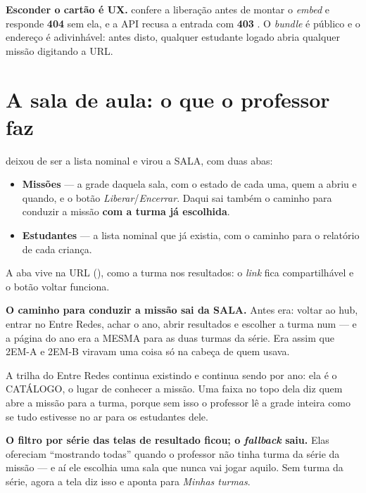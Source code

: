 \begin{regra}
\textbf{Esconder o cartão é UX.}  confere a liberação antes de
montar o \emph{embed} e responde \textbf{404} sem ela, e a API recusa a entrada com
\textbf{403} . O \emph{bundle} é público e o endereço é
adivinhável: antes disto, qualquer estudante logado abria qualquer missão
digitando a URL.
\end{regra}

\section{A sala de aula: o que o professor faz}
\label{sec:sala-do-professor}

 deixou de ser a lista nominal e virou a SALA, com
duas abas:

\begin{itemize}
  \item \textbf{Missões} --- a grade daquela sala, com o estado de cada uma, quem
    a abriu e quando, e o botão \emph{Liberar}/\emph{Encerrar}. Daqui sai também o
    caminho para conduzir a missão \textbf{com a turma já escolhida}.
  \item \textbf{Estudantes} --- a lista nominal que já existia, com o caminho para
    o relatório de cada criança.
\end{itemize}

A aba vive na URL (), como a turma nos resultados: o \emph{link} fica
compartilhável e o botão voltar funciona.

\begin{decisao}
\textbf{O caminho para conduzir a missão sai da SALA.} Antes era: voltar ao hub,
entrar no Entre Redes, achar o ano, abrir resultados e escolher a turma num
 --- e a página do ano era a MESMA para as duas turmas da série. Era
assim que 2EM-A e 2EM-B viravam uma coisa só na cabeça de quem usava.

A trilha do Entre Redes continua existindo e continua sendo por ano: ela é o
CATÁLOGO, o lugar de conhecer a missão. Uma faixa no topo dela diz quem abre a
missão para a turma, porque sem isso o professor lê a grade inteira como se tudo
estivesse no ar para os estudantes dele.
\end{decisao}

\begin{nota}
\textbf{O filtro por série das telas de resultado ficou; o \emph{fallback} saiu.}
Elas ofereciam \enquote{mostrando todas} quando o professor não tinha turma da
série da missão --- e aí ele escolhia uma sala que nunca vai jogar aquilo. Sem
turma da série, agora a tela diz isso e aponta para \emph{Minhas turmas}.
\end{nota}

